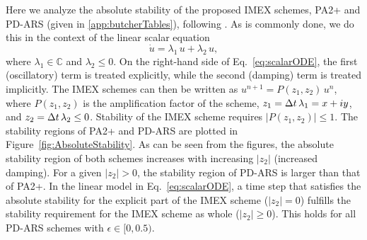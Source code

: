 Here we analyze the absolute stability of the proposed IMEX schemes, PA2+ and PD-ARS (given in \ref{app:butcherTables}), following \cite{hu_etal_2018}.  
As is commonly done, we do this in the context of the linear scalar equation
\begin{equation}
  \dot{u}=\lambda_{1}\,u+\lambda_{2}\,u,
  \label{eq:scalarODE}
\end{equation}
where $\lambda_{1}\in\mathbb{C}$ and $\lambda_{2}\le0$.  
On the right-hand side of Eq.~\eqref{eq:scalarODE}, the first (oscillatory) term is treated explicitly, while the second (damping) term is treated implicitly.  
The IMEX schemes can then be written as $u^{n+1} =P(z_{1},z_{2})\,u^{n}$, where $P(z_{1},z_{2})$ is the amplification factor of the scheme, $z_{1}=\Delta t\,\lambda_{1} = x +iy$, and $z_{2} = \Delta t\,\lambda_{2} \le 0$.  
Stability of the IMEX scheme requires $|P(z_1,z_2)|\leq 1$.  
The stability regions of PA2+ and PD-ARS are plotted in Figure~\ref{fig:AbsoluteStability}.  
As can be seen from the figures, the absolute stability region of both schemes increases with increasing $|z_{2}|$ (increased damping).  
For a given $|z_{2}|>0$, the stability region of PD-ARS is larger than that of PA2+.  
In the linear model in Eq.~\eqref{eq:scalarODE}, a time step that satisfies the absolute stability for the explicit part of the IMEX scheme ($|z_2| = 0$) fulfills the stability requirement for the IMEX scheme as whole ($|z_2| \geq 0$).  
This holds for all PD-ARS schemes with $\epsilon\in [0,0.5)$.
